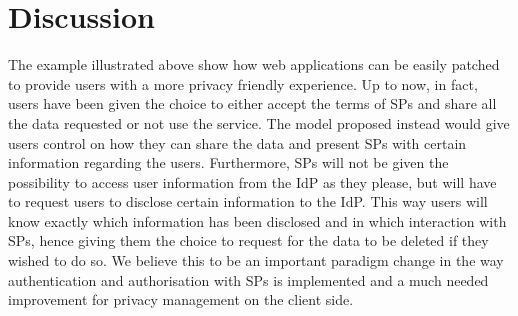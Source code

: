 \section{Discussion}

The example illustrated above show how web applications can be easily patched to provide users with a more privacy friendly experience. Up to now, in fact, users have been given the choice to either accept the terms of SPs and share all the data requested or not use the service. The model proposed instead would give users control on how they can share the data and present SPs with certain information regarding the users. 
Furthermore, SPs will not be given the possibility to access user information from the IdP as they please, but will have to request users to disclose certain information to the IdP. This way users will know exactly which information has been disclosed and in which interaction with SPs, hence giving them the choice to request for the data to be deleted if they wished to do so.
We believe this to be an important paradigm change in the way authentication and authorisation with SPs is implemented and a much needed improvement for privacy management on the client side.
